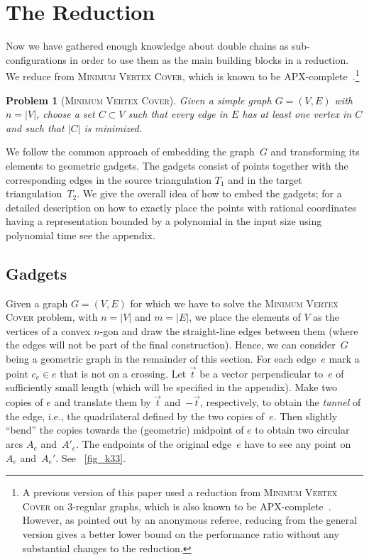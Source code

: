 \documentclass[11pt,a4paper]{article}
\newtheorem{problem}{Problem}
\begin{document}
\section{The Reduction}
\label{sec_reduction}
Now we have gathered enough knowledge about double chains as sub-configurations in order to use them as the main building blocks in a reduction.
We reduce from \textsc{Minimum Vertex Cover}, which is known to be APX-complete~\cite{vertex_cover_apx}.\footnote{A previous version of this paper used a reduction from \textsc{Minimum Vertex Cover} on 3-regular graphs, which is also known to be APX-complete~\cite{cubic_apx}. However, as pointed out by an anonymous referee, reducing from the general version gives a better lower bound on the performance ratio without any substantial changes to the reduction.} 

\begin{problem}[\textsc{Minimum Vertex Cover}]
Given a simple graph $G = (V, E)$ with $n = |V|$, choose a set $C \subset V$ such that every edge in $E$ has at least one vertex in $C$ and such that $|C|$ is minimized.
\end{problem}

We follow the common approach of embedding the graph~$G$ and transforming its elements to geometric gadgets.
The gadgets consist of points together with the corresponding edges in the source triangulation $T_1$ and in the target triangulation~$T_2$.
We give the overall idea of how to embed the gadgets; for a detailed description on how to exactly place the points with rational coordinates having a representation bounded by a polynomial in the input size using polynomial time see the appendix.

\subsection{Gadgets}
Given a graph $G = (V, E)$ for which we have to solve the \textsc{Minimum Vertex Cover} problem, with $n = |V|$ and $m = |E|$, we place the elements of $V$ as the vertices of a convex $n$-gon and draw the straight-line edges between them (where the edges will not be part of the final construction).
Hence, we can consider~$G$ being a geometric graph in the remainder of this section.
For each edge~$e$ mark a point $c_e \in e$ that is not on a crossing.
Let $\vec t$ be a vector perpendicular to~$e$ of sufficiently small length (which will be specified in the appendix).
Make two copies of $e$ and translate them by $\vec t$ and~$-\vec t$, respectively, to obtain the \emph{tunnel} of the edge, i.e., the quadrilateral defined by the two copies of~$e$.
Then slightly ``bend'' the copies towards the (geometric) midpoint of $e$ to obtain two circular arcs $A_e$ and~$A'_e$.
The endpoints of the original edge~$e$ have to see any point on $A_e$ and~$A_e'$.
See \figurename~\ref{fig_k33}.
\end{document}
